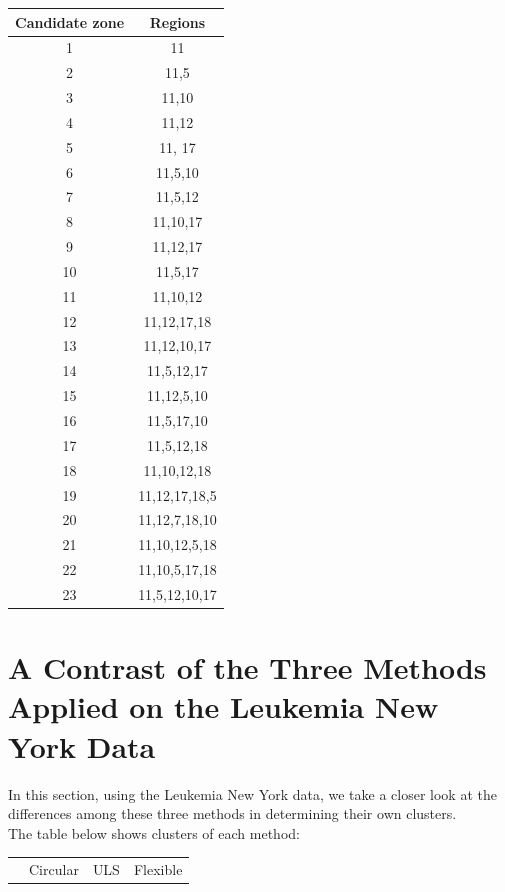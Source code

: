 \documentclass[12pt]{article}
\begin{document}
\begin{enumerate}
	
	\begin{tabular}{|c|c|}
		\hline
		Candidate zone & Regions  \\
		\hline
		1 & 11  \\
		2 & 11,5 \\
		3 & 11,10 \\
		4 & 11,12 \\
		5 & 11, 17 \\
		6 &  11,5,10 \\
		7 & 11,5,12 \\
		8 & 11,10,17 \\
		9 & 11,12,17 \\
		10 & 11,5,17 \\
		11 & 11,10,12 \\
		12 & 11,12,17,18 \\
		13 & 11,12,10,17 \\
		14 & 11,5,12,17 \\
		15 & 11,12,5,10 \\
		16 & 11,5,17,10 \\
		17 & 11,5,12,18 \\
		18 & 11,10,12,18 \\
		19 &  11,12,17,18,5\\ 
		20 &   11,12,7,18,10 \\
		21 & 11,10,12,5,18 \\
		22 & 11,10,5,17,18 \\
		 23& 11,5,12,10,17 \\
	\hline
	\end{tabular}
	
	\section{A Contrast of the Three Methods Applied on the Leukemia New York Data}
	In this section, using the Leukemia New York data, we take a closer look at the differences among these three methods in determining their own clusters. \\
	The table below shows clusters of each method:\\
	
	\begin{tabular}{|c|c|c|c|}
	\hline
	& Circular & ULS & Flexible \\
	

\end{tabular}
\end{enumerate}
\end{document}
